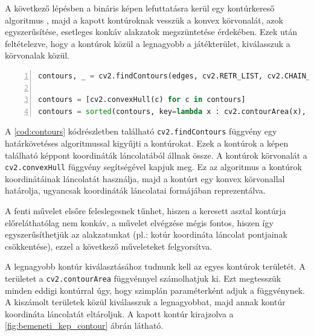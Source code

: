\par A következő lépésben a bináris képen lefuttatásra kerül egy kontúrkereső algoritmus \cite{SUZUKI198532}, majd a kapott kontúroknak vesszük a konvex körvonalát, azok egyszerűsítése, esetleges konkáv alakzatok megszüntetése érdekében. Ezek után feltételezve, hogy a kontúrok közül a legnagyobb a játékterület, kiválasszuk a körvonalak közül.

\vspace{2mm}
\hspace{-10mm}
\begin{minipage}{\linewidth}
\begin{lstlisting}[language=Python, numbers=left, caption={Kontúrok keresése.}, label={cod:contours}]
contours, _ = cv2.findContours(edges, cv2.RETR_LIST, cv2.CHAIN_APPROX_SIMPLE)

contours = [cv2.convexHull(c) for c in contours]
contours = sorted(contours, key=lambda x : cv2.contourArea(x), reverse=True)[:1]
\end{lstlisting}
\end{minipage}

\par A \ref{cod:contours} kódrészletben található \lstinline{cv2.findContours} függvény \cite{cv2_find_contours, SUZUKI198532} egy határkövetéses algoritmussal kigyűjti a kontúrokat. Ezek a kontúrok a képen található képpont koordináták láncolatából állnak össze. A kontúrok körvonalát a \lstinline{cv2.convexHull} függvény \cite{cv2_convex_hull,SKLANSKY198279} segítségével kapjuk meg. Ez az algoritmus a kontúrok koordinátáinak láncolatát használja, majd a kontúrt egy konvex körvonallal határolja, ugyancsak koordináták láncolatai formájában reprezentálva.
\par A fenti művelet elsőre feleslegesnek tűnhet, hiszen a keresett asztal kontúrja előreláthatólag nem konkáv, a művelet elvégzése mégis fontos, hiszen így egyszerűsíthetjük az alakzatunkat (pl.: kotúr koordináta láncolat pontjainak csökkentése), ezzel a következő műveleteket felgyorsítva.
\par A legnagyobb kontúr kiválasztásához tudnunk kell az egyes kontúrok területét. A területet a \lstinline{cv2.contourArea} függvénnyel \cite{cv2_contour_area} számolhatjuk ki. Ezt megtesszük minden eddigi kontúrral úgy, hogy szimplán paraméterként adjuk a függvénynek. A kiszámolt területek közül kiválasszuk a legnagyobbat, majd annak kontúr koordináta láncolatát eltároljuk. A kapott kontúr kirajzolva a \ref{fig:bemeneti_kep_contour} ábrán látható.

